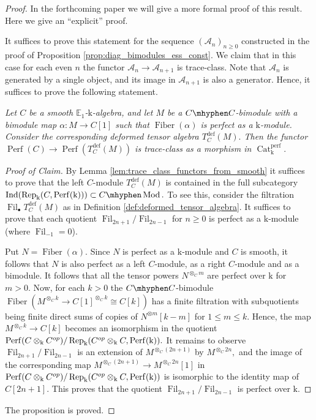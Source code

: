 \documentclass[11pt,leqno]{amsart}
\numberwithin{equation}{section}
\newcommand{\tens}[1]{%
  \mathbin{\mathop{\otimes}\displaylimits_{#1}}%
}
\newcommand{\hy}{\mhyphen}
\newcommand{\xto}{\xrightarrow}
\newcommand{\Cat}{\operatorname{Cat}}
\newcommand{\Fiber}{\operatorname{Fiber}}
\newcommand{\deff}{\operatorname{def}}
\newcommand{\Fil}{\operatorname{Fil}}
\newcommand{\bE}{{\mathbb E}}
\newcommand{\mk}{\mathrm k}
\newcommand{\cA}{{\mathcal A}}
\newcommand{\Perf}{\operatorname{Perf}}
\newcommand{\perf}{\operatorname{perf}}
\newcommand{\Rep}{\operatorname{Rep}}
\newcommand{\Ind}{\operatorname{Ind}}
\newcommand{\Mod}{\operatorname{Mod}}
\begin{document}
\begin{proof} 
In the forthcoming paper \cite{E} we will give a more formal proof of this result. Here we give an ``explicit'' proof.

It suffices to prove this statement for the sequence $(\cA_n)_{n\geq 0}$ constructed in the proof of Proposition \ref{prop:diag_bimodules_ess_const}. We claim that in this case for each even $n$ the functor $\cA_n\to\cA_{n+1}$ is trace-class. Note that $\cA_n$ is generated by a single object, and its image in $\cA_{n+1}$ is also a generator. Hence, it suffices to prove the following statement.

{} {\it Let $C$ be a smooth $\bE_1$-$\mk$-algebra, and let $M$ be a $C\hy C$-bimodule with a bimodule map $\alpha:M\to C[1]$ such that $\Fiber(\alpha)$ is perfect as a $\mk$-module. Consider the corresponding deformed tensor algebra $T_C^{\deff}(M).$ Then the functor $\Perf(C)\to\Perf(T_C^{\deff}(M))$ is trace-class as a morphism in $\Cat_{\mk}^{\perf}.$}

\begin{proof}[Proof of Claim] By Lemma \ref{lem:trace_class_functors_from_smooth} it suffices to prove that the left $C$-module $T_C^{\deff}(M)$ is contained in the full subcategory $\Ind(\Rep_{\mk}(C,\Perf(\mk)))\subset C\hy\Mod.$ To see this, consider the filtration $\Fil_{\bullet}T_C^{\deff}(M)$ as in Definition \ref{def:deformed_tensor_algebra}.
It suffices to prove that each quotient $\Fil_{2n+1}/\Fil_{2n-1}$ for $n\geq 0$ is perfect as a $\mk$-module (where $\Fil_{-1}=0$).

Put $N=\Fiber(\alpha).$ Since $N$ is perfect as a $\mk$-module and $C$ is smooth, it follows that $N$ is also perfect as a left $C$-module, as a right $C$-module and as a bimodule. It follows that all the tensor powers $N^{\otimes_C m}$ are perfect over $\mk$ for $m>0.$ Now, for each $k>0$ the $C\hy C$-bimodule $\Fiber(M^{\otimes_C k}\to  C[1]^{\otimes_C k}\cong C[k])$ has a finite filtration with subquotients being finite direct sums of copies of $N^{\otimes m}[k-m]$ for $1\leq m\leq k.$ Hence, the map $ M^{\otimes_C k}\to C[k]$ becomes an isomorphism in the quotient $\Perf(C\tens{\mk}C^{op})/\Rep_{\mk}(C^{op}\tens{\mk}C,\Perf(\mk)).$ It remains to observe 
$\Fil_{2n+1}/\Fil_{2n-1}$ is an extension of $M^{\otimes_C (2n+1)}$ by $M^{\otimes_C 2n},$ and the image of the corresponding map $M^{\otimes_C (2n+1)}\to M^{\otimes_C 2n}[1]$ in $\Perf(C\tens{\mk}C^{op})/\Rep_{\mk}(C^{op}\tens{\mk}C,\Perf(\mk))$ is isomorphic to the identity map of $C[2n+1].$ This proves that the quotient $\Fil_{2n+1}/\Fil_{2n-1}$ is perfect over $\mk.$
\end{proof}
The proposition is proved.
\end{proof}
\end{document}
